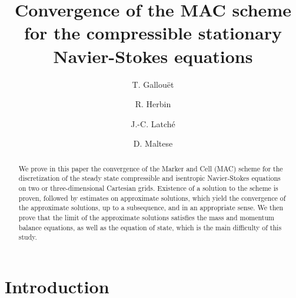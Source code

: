 \documentclass{amsart}
\numberwithin{equation}{section}
\begin{document}
\title[Convergence of the MAC scheme]{Convergence  of the MAC scheme for the  compressible stationary Navier-Stokes equations}

\author{T. Gallou\"et}
\address{Universit\'e d'Aix-Marseille, France}

\author{R. Herbin}
\address{Universit\'e d'Aix-Marseille, France}

\author{J.-C. Latch\'e}
\address{Institut de Radioprotection et de S\^{u}ret\'{e} Nucl\'{e}aire, France}

\author{D. Maltese}
\address{Universit\' e de Toulon, France}


\begin{abstract}
We prove in this paper the convergence of the Marker and Cell (MAC) scheme for the discretization of the steady state compressible and isentropic Navier-Stokes equations on two or three-dimensional Cartesian grids. Existence of a solution to the scheme is proven, followed by estimates on approximate solutions, which yield the convergence of the approximate solutions, up to a subsequence, and in an appropriate sense. We then prove that the limit of the approximate solutions satisfies the mass and momentum balance equations, as well as the equation of state, which is the main difficulty of this study.
\end{abstract}

\maketitle

\section{Introduction}\label{intro}
\end{document}
